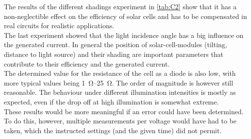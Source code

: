 \documentclass[english,  %
parskip=full,  %
headsepline]{scrartcl}
\begin{document}
The results of the different shadings experiment in \cref{tab:C2} show that it has a non-neglectible effect on the efficiency of solar cells and has to be compensated in real circuits for realistic applications.\\
The last experiment showed that the light incidence angle has a big influence on the generated current. In general the position of solar-cell-modules (tilting, distance to light source) and their shading are important parameters that contribute to their efficiency and the generated current.\\
The determined value for the resistance of the cell as a diode is also low, with more typical values being  \SIrange{1}{25}{\ohm}. The order of magnitude is however still reasonable. The behaviour under different illumination intensities is mostly as expected, even if the drop off at high illumination is somewhat extreme. \\
These results would be more meaningful if an error could have been determined. To do this, however, multiple measurements per voltage would have had to be taken, which the instructed settings (and the given time) did not permit. 

\printbibliography
\end{document}
